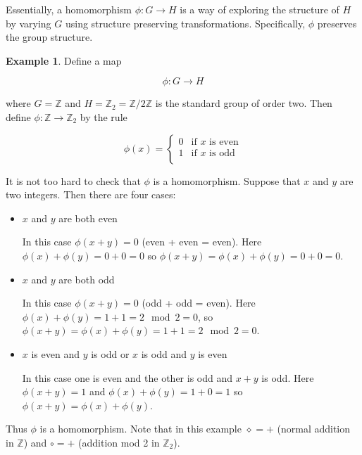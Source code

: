 \documentclass{article}
\theoremstyle{definition}
\newtheorem{example}{Example}[section]
\begin{document}
\bigskip
\noindent
Essentially, a homomorphism $\phi: G \rightarrow H$ is a way of
exploring the structure of $H$ by varying $G$ using structure
preserving transformations. Specifically, $\phi$ preserves the
group structure.


\bigskip
\noindent
\begin{example} Define a map 

\begin{equation*}
\phi : G \rightarrow H
\end{equation*}

\bigskip
\noindent
where $G = \mathbb{Z}$ and $H = \mathbb{Z}_2 =
\mathbb{Z}/2\mathbb{Z}$ is the standard group of order two. Then
define $\phi: \mathbb{Z} \rightarrow \mathbb{Z}_2$ by the rule

\begin{equation*}
  \phi(x) =
    \begin{cases}
      0 & \text{if $x$ is even} \\
      1 & \text{if $x$ is odd}  \\
    \end{cases}       
\end{equation*}

\bigskip
\noindent
It is not too hard to check that $\phi$ is a homomorphism. 
Suppose that $x$ and $y$ are two integers. Then there are 
four cases:

\begin{itemize}
 \item $x$ and $y$ are both even
 
 In this case $\phi(x+y) = 0$ (even + even = even). Here
 $\phi(x)+\phi(y) = 0+0 = 0$ so $\phi(x+y) = \phi(x) + \phi(y) =
 0 + 0 = 0$.
 
 \item $x$ and $y$ are both odd
  
In this case $\phi(x+y) = 0$ (odd + odd = even). Here $\phi(x) +
\phi(y) = 1 + 1 = 2 \mod 2 = 0$, so $\phi(x+y) = \phi(x) +
\phi(y) = 1 + 1 = 2 \mod 2 = 0$.

 \item $x$ is even and $y$ is odd or  $x$ is odd and  $y$ is even
 
In this case one is even and the other is odd and $x + y$ is odd.
Here $\phi(x+y) = 1$ and $\phi(x)+\phi(y) = 1+0 = 1$ so
$\phi(x+y) = \phi(x)+\phi(y)$.
 \end{itemize}
 
\smallskip
\noindent
Thus $\phi$ is a homomorphism. Note that in this example
$\diamond = +$ (normal addition in $\mathbb{Z}$) and $\circ = +$
(addition mod 2 in $\mathbb{Z}_2$).
\end{example}
\end{document}
